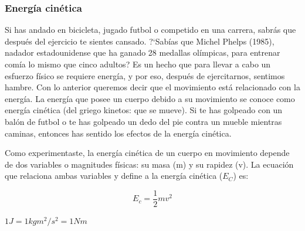\documentclass[11pt]{book}
\begin{document}
\subsubsection{Energ\'ia cin\'etica}
Si has andado en bicicleta, jugado futbol o competido en una carrera, sabr\'as
que despu\'es del ejercicio te sientes cansado. ?`Sab\'ias que Michel Phelps
(1985), nadador estadounidense que ha ganado 28 medallas ol\'impicas, para
entrenar com\'ia lo mismo que cinco adultos? Es un hecho que para llevar a
cabo un esfuerzo f\'isico se requiere energ\'ia, y por eso, despu\'es de
ejercitarnos, sentimos hambre. Con lo anterior queremos decir que el movimiento
est\'a relacionado con la energ\'ia. La energ\'ia que posee un cuerpo debido a
su movimiento se conoce como energ\'ia cin\'etica (del griego kinetos: que se
mueve). Si te has golpeado con un bal\'on de futbol o te has golpeado un dedo
del pie contra un mueble mientras caminas, entonces has sentido los efectos de
la energ\'ia cin\'etica.

Como experimentaste, la energ\'ia cin\'etica de un cuerpo en movimiento depende de
dos variables o magnitudes f\'isicas: su masa (m) y su rapidez (v). La ecuaci\'on
que relaciona ambas variables y define a la energ\'ia cin\'etica ($E_C$) es:

\begin{equation*}
  E_c=\frac{1}{2}mv^2
\end{equation*}


\( 1 J = 1 kg m^2/s^2 = 1 Nm \)
\end{document}
